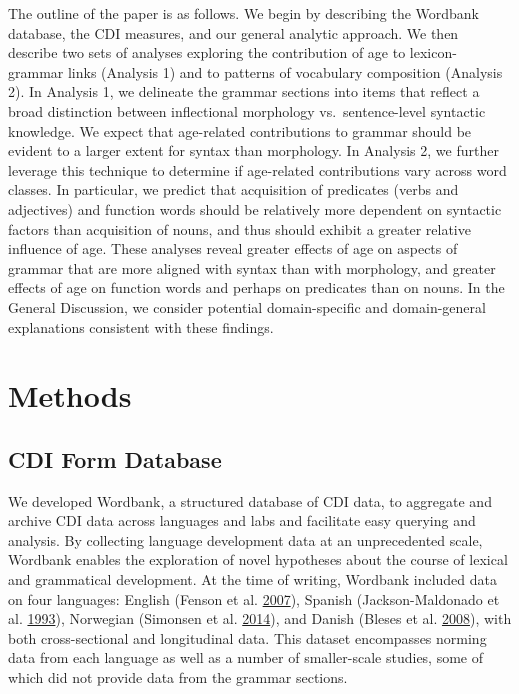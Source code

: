 \documentclass[authoryear, review]{elsarticle}
\begin{document}
The outline of the paper is as follows. We begin by describing the
Wordbank database, the CDI measures, and our general analytic approach.
We then describe two sets of analyses exploring the contribution of age
to lexicon-grammar links (Analysis 1) and to patterns of vocabulary
composition (Analysis 2). In Analysis 1, we delineate the grammar
sections into items that reflect a broad distinction between
inflectional morphology vs.~sentence-level syntactic knowledge. We
expect that age-related contributions to grammar should be evident to a
larger extent for syntax than morphology. In Analysis 2, we further
leverage this technique to determine if age-related contributions vary
across word classes. In particular, we predict that acquisition of
predicates (verbs and adjectives) and function words should be
relatively more dependent on syntactic factors than acquisition of
nouns, and thus should exhibit a greater relative influence of age.
These analyses reveal greater effects of age on aspects of grammar that
are more aligned with syntax than with morphology, and greater effects
of age on function words and perhaps on predicates than on nouns. In the
General Discussion, we consider potential domain-specific and
domain-general explanations consistent with these findings.

\section{Methods}\label{methods}

\subsection{CDI Form Database}\label{cdi-form-database}

We developed Wordbank, a structured database of CDI data, to aggregate
and archive CDI data across languages and labs and facilitate easy
querying and analysis. By collecting language development data at an
unprecedented scale, Wordbank enables the exploration of novel
hypotheses about the course of lexical and grammatical development. At
the time of writing, Wordbank included data on four languages: English
(Fenson et al. \hyperref[ref-fenson2007]{2007}), Spanish
(Jackson-Maldonado et al. \hyperref[ref-jackson1993]{1993}), Norwegian
(Simonsen et al. \hyperref[ref-simonsen2014]{2014}), and Danish (Bleses
et al. \hyperref[ref-bleses2008]{2008}), with both cross-sectional and
longitudinal data. This dataset encompasses norming data from each
language as well as a number of smaller-scale studies, some of which did
not provide data from the grammar sections.
\end{document}
